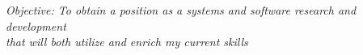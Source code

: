 \documentclass{res}
\begin{document}
 
\thispagestyle{empty} %
\vspace{0.3in}
\address{
{\tt hyogi@vt.edu}, (540) 391-0202 \\
Dept. of Computer Science, Virginia Tech\\
2202 Kraft Drive, Blacksburg, VA 24060\\
}


\begin{resume}
\vspace{0.1in}
{\it Objective: To obtain a position as a systems and software research and
development\\
that will both utilize and enrich my current skills}

 
 
 






 
\end{resume}
\end{document}
